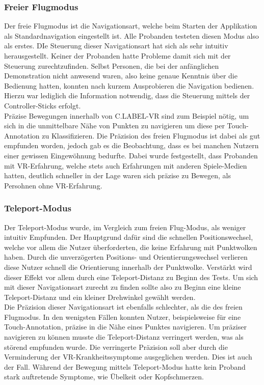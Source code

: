 \subsubsection{Freier Flugmodus}
Der freie Flugmodus ist die Navigationsart, welche beim Starten der Applikation als Standardnavigation eingestellt ist. Alle Probanden testeten diesen Modus also als erstes. DIe Steuerung dieser Navigationsart hat sich als sehr intuitiv herausgestellt. Keiner der Probanden hatte Probleme damit sich mit der Steuerung zurechtzufinden. Selbst Personen, die bei der anfänglichen Demonstration nicht anwesend waren, also keine genaue Kenntnis über die Bedienung hatten, konnten nach kurzem Ausprobieren die Navigation bedienen. Hierzu war lediglich die Information notwendig, dass die Steuerung mittels der Controller-Sticks erfolgt.\\

Präzise Bewegungen innerhalb von C.LABEL-VR sind zum Beispiel nötig, um sich in die unmittelbare Nähe von Punkten zu navigieren um diese per Touch-Annotation zu Klassifizieren. Die Präzision des freien Flugmodus ist dabei als gut empfunden worden, jedoch gab es die Beobachtung, dass es bei manchen Nutzern einer gewissen Eingewöhnung bedurfte. Dabei wurde festgestellt, dass Probanden mit VR-Erfahrung, welche stets auch Erfahrungen mit anderen Spiele-Medien hatten, deutlich schneller in der Lage waren sich präzise zu Bewegen, als Persohnen ohne VR-Erfahrung.

\subsubsection{Teleport-Modus}
Der Teleport-Modus wurde, im Vergleich zum freien Flug-Modus, als weniger intuitiv Empfunden. Der Hauptgrund dafür sind die schnellen Positionswechsel, welche vor allem die Nutzer überforderten, die keine Erfahrung mit Punktwolken haben. Durch die unverzögerten Positions- und Orientierungswechsel verlieren diese Nutzer schnell die Orientierung innerhalb der Punktwolke. Verstärkt wird dieser Effekt vor allem durch eine Teleport-Distanz zu Beginn des Tests. Um sich mit dieser Navigationsart zurecht zu finden sollte also zu Beginn eine kleine Teleport-Distanz und ein kleiner Drehwinkel gewählt werden.\\

Die Präzision dieser Navigationsart ist ebenfalls schlechter, als die des freien Flugmodus. In den wenigsten Fällen konnten Nutzer, beispielsweise für eine Touch-Annotation, präzise in die Nähe eines Punktes navigieren. Um präziser navigieren zu können musste die Teleport-Distanz verringert werden, was als störend empfunden wurde. Die verringerte Präzision soll aber durch die Verminderung der VR-Krankheitssymptome ausgeglichen werden. Dies ist auch der Fall. Während der Bewegung mittels Teleport-Modus hatte kein Proband stark auftretende Symptome, wie Übelkeit oder Kopfschmerzen.\\

